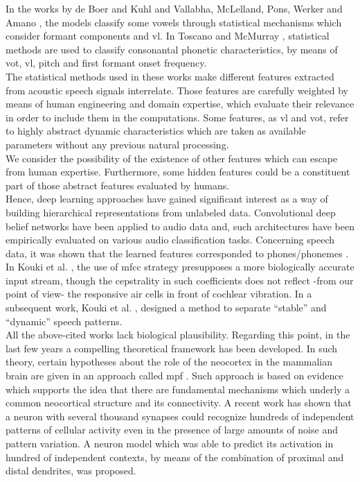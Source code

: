 \documentclass[11pt,a4paper]{article}
\begin{document}
In the works by de Boer and Kuhl \cite{boer_2003} and Vallabha, McLelland, Pons,
Werker and Amano \cite{vallabha_2007}, the models classify some vowels
through statistical mechanisms which consider formant components
and \gls{vl}.
In Toscano and McMurray \cite{toscano_2010},
statistical methods are used to classify consonantal phonetic
characteristics, by means of \gls{vot},
\gls{vl}, pitch and first formant onset frequency. \\

The statistical methods used in these works make
different features extracted from acoustic speech signals
interrelate.
Those features are carefully weighted
by means of human engineering and domain expertise,
which evaluate their relevance in order to include them
in the computations.
Some features, as \gls{vl} and \gls{vot},
refer to highly abstract dynamic characteristics
which are taken
as available parameters without any previous natural
processing.\\

We consider the possibility of the existence of other
features which can escape from human expertise.
Furthermore, some hidden features could be a constituent
part of those abstract features evaluated by humans. \\

Hence, deep learning approaches have gained significant interest as a
way of building hierarchical representations from unlabeled data.
Convolutional deep belief networks have been applied to audio data and,
such architectures have been empirically evaluated on various audio classification
tasks. Concerning speech data, it was shown that the learned features corresponded
to phones/phonemes \cite{Lee:2009:UFL:2984093.2984217}. \\

In Kouki et al. \cite{kouki_2010},
the use of \gls{mfcc}
strategy presupposes a more biologically accurate input stream,
though the cepstrality in such coefficients does not reflect
-from our point of view-
the responsive air cells in front of cochlear vibration.
In a subsequent work, Kouki et al. \cite{kouki_2011},
designed a method to separate “stable” and “dynamic” speech
patterns. \\

All the above-cited works lack biological plausibility.
Regarding this point, in the last few years a compelling
theoretical framework has been developed.
In such theory, certain hypotheses about the role of
the neocortex in the mammalian brain are given in an
approach called \gls{mpf}
\cite{hawkins_2004}.
Such approach is based on evidence
which supports the idea that there are fundamental
mechanisms which underly a common neocortical
structure and its connectivity.
A recent work has shown that a neuron with
several thousand synapses could recognize hundreds
of independent patterns of cellular activity even
in the presence of large amounts of
noise and pattern variation.
A neuron model which was able to predict its activation in hundred 
of independent contexts, by means of
the combination of proximal and distal dendrites, was proposed.
\end{document}
